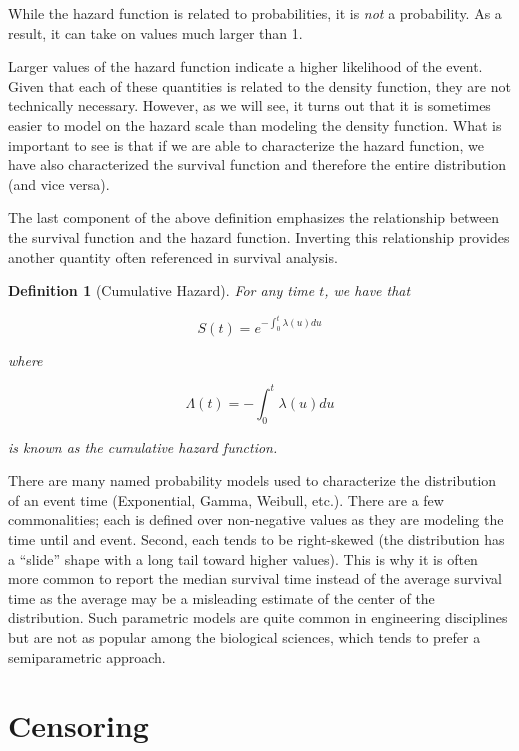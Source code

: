 \documentclass[
]{book}
\theoremstyle{plain}
\theoremstyle{mydefn}
\newtheorem{definition}{Definition}[chapter]
\theoremstyle{myexmpl}
\theoremstyle{remark}
\begin{document}
\begin{rmdwarning}
While the hazard function is related to probabilities, it is \emph{not} a probability. As a result, it can take on values much larger than 1.\\
\end{rmdwarning}

Larger values of the hazard function indicate a higher likelihood of the event. Given that each of these quantities is related to the density function, they are not technically necessary. However, as we will see, it turns out that it is sometimes easier to model on the hazard scale than modeling the density function. What is important to see is that if we are able to characterize the hazard function, we have also characterized the survival function and therefore the entire distribution (and vice versa).

The last component of the above definition emphasizes the relationship between the survival function and the hazard function. Inverting this relationship provides another quantity often referenced in survival analysis.

\begin{definition}[Cumulative Hazard]
\protect\hypertarget{def:defn-cumulative-hazard}{}{\label{def:defn-cumulative-hazard} {} }For any time \(t\), we have that

\[S(t) = e^{-\int_{0}^{t} \lambda(u) du}\]

where

\[\Lambda(t) = -\int_{0}^{t} \lambda(u) du\]

is known as the cumulative hazard function.
\end{definition}

There are many named probability models used to characterize the distribution of an event time (Exponential, Gamma, Weibull, etc.). There are a few commonalities; each is defined over non-negative values as they are modeling the time until and event. Second, each tends to be right-skewed (the distribution has a ``slide'' shape with a long tail toward higher values). This is why it is often more common to report the median survival time instead of the average survival time as the average may be a misleading estimate of the center of the distribution. Such parametric models are quite common in engineering disciplines but are not as popular among the biological sciences, which tends to prefer a semiparametric approach.

\hypertarget{surv-censoring}{%
\chapter{Censoring}\label{surv-censoring}}
\end{document}
